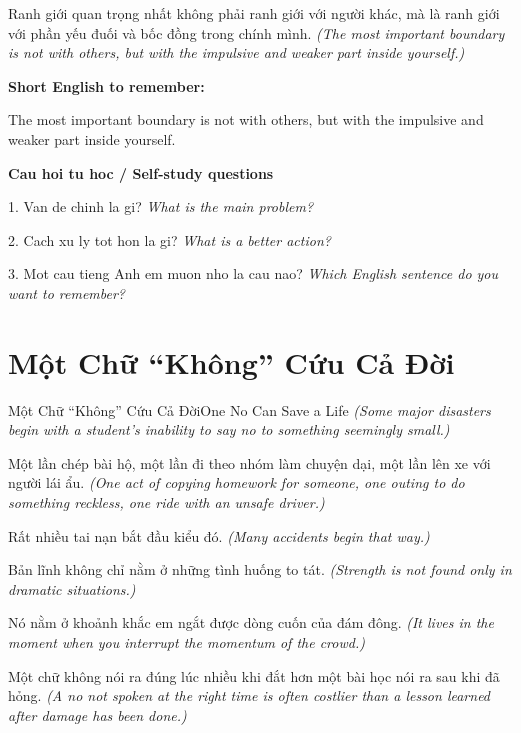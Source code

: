 \begin{baihoc}
Ranh giới quan trọng nhất không phải ranh giới với người khác, mà là ranh giới với phần yếu đuối và bốc đồng trong chính mình.
\textit{(The most important boundary is not with others, but with the impulsive and weaker part inside yourself.)}
\end{baihoc}

\begin{ghinhoanh}
\textbf{Short English to remember:}

The most important boundary is not with others, but with the impulsive and weaker part inside yourself.

\end{ghinhoanh}

\begin{tuhocnhanh}
\textbf{Cau hoi tu hoc / Self-study questions}

1. Van de chinh la gi? \textit{What is the main problem?}

2. Cach xu ly tot hon la gi? \textit{What is a better action?}

3. Mot cau tieng Anh em muon nho la cau nao? \textit{Which English sentence do you want to remember?}
\end{tuhocnhanh}
\ngancach

\section{Một Chữ “Không” Cứu Cả Đời}
\begin{truyen}{Một Chữ “Không” Cứu Cả Đời}{One No Can Save a Life}
\textit{(Some major disasters begin with a student’s inability to say no to something seemingly small.)}

Một lần chép bài hộ, một lần đi theo nhóm làm chuyện dại, một lần lên xe với người lái ẩu.
\textit{(One act of copying homework for someone, one outing to do something reckless, one ride with an unsafe driver.)}

Rất nhiều tai nạn bắt đầu kiểu đó.
\textit{(Many accidents begin that way.)}

Bản lĩnh không chỉ nằm ở những tình huống to tát.
\textit{(Strength is not found only in dramatic situations.)}

Nó nằm ở khoảnh khắc em ngắt được dòng cuốn của đám đông.
\textit{(It lives in the moment when you interrupt the momentum of the crowd.)}

Một chữ không nói ra đúng lúc nhiều khi đắt hơn một bài học nói ra sau khi đã hỏng.
\textit{(A no not spoken at the right time is often costlier than a lesson learned after damage has been done.)}

\end{truyen}


